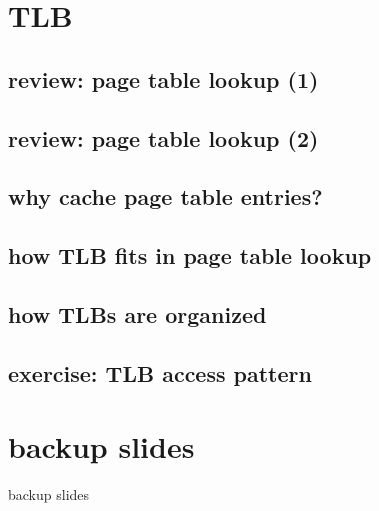 \section{TLB}

\subsection{review: page table lookup (1)}


\subsection{review: page table lookup (2)}

\subsection{why cache page table entries?}


\subsection{how TLB fits in page table lookup}


\subsection{how TLBs are organized}

\subsection{exercise: TLB access pattern}







\section{backup slides}
\begin{frame}{backup slides}
\end{frame}


